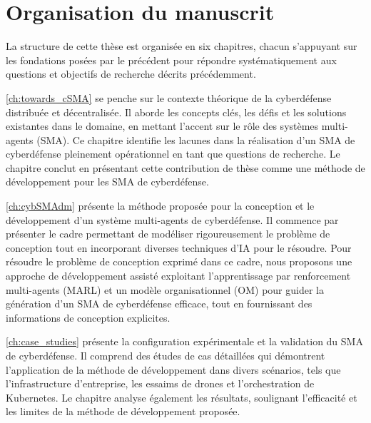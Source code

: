 \section{Organisation du manuscrit}

La structure de cette thèse est organisée en six chapitres, chacun s'appuyant sur les fondations posées par le précédent pour répondre systématiquement aux questions et objectifs de recherche décrits précédemment.


\autoref{ch:towards_cSMA} se penche sur le contexte théorique de la cyberdéfense distribuée et décentralisée. Il aborde les concepts clés, les défis et les solutions existantes dans le domaine, en mettant l'accent sur le rôle des systèmes multi-agents (SMA). Ce chapitre identifie les lacunes dans la réalisation d'un SMA de cyberdéfense pleinement opérationnel en tant que questions de recherche. Le chapitre conclut en présentant cette contribution de thèse comme une méthode de développement pour les SMA de cyberdéfense.

\autoref{ch:cybSMAdm} présente la méthode proposée pour la conception et le développement d'un système multi-agents de cyberdéfense. Il commence par présenter le cadre permettant de modéliser rigoureusement le problème de conception tout en incorporant diverses techniques d'IA pour le résoudre. Pour résoudre le problème de conception exprimé dans ce cadre, nous proposons une approche de développement assisté exploitant l'apprentissage par renforcement multi-agents (MARL) et un modèle organisationnel (OM) pour guider la génération d'un SMA de cyberdéfense efficace, tout en fournissant des informations de conception explicites.

\autoref{ch:case_studies} présente la configuration expérimentale et la validation du SMA de cyberdéfense. Il comprend des études de cas détaillées qui démontrent l'application de la méthode de développement dans divers scénarios, tels que l'infrastructure d'entreprise, les essaims de drones et l'orchestration de Kubernetes. Le chapitre analyse également les résultats, soulignant l'efficacité et les limites de la méthode de développement proposée.

